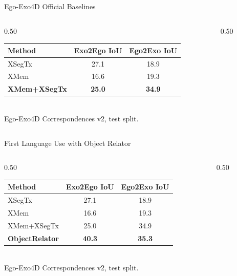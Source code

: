 \documentclass[professionalfonts,aspectratio=169]{beamer}
\begin{document}
\begin{frame}[t]
\begin{center}
{\large Ego-Exo4D Official Baselines}
\end{center}
\vfill
\begin{columns}
  \begin{column}{0.50\textwidth}
    \centering
    \small
    \begin{tabular}{lcc}
      \toprule
      Method & Exo2Ego IoU & Ego2Exo IoU \\
      \midrule
      XSegTx      & 27.1 & 18.9 \\
      XMem        & 16.6 & 19.3 \\
     \textbf{ XMem+XSegTx} & \textbf{25.0} & \textbf{34.9} \\
      \bottomrule
    \end{tabular}
    \\[0.6em]
    {\scriptsize Ego-Exo4D Correspondences v2, test split.}
  \end{column}
  \begin{column}{0.50\textwidth}
    \mbox{}
  \end{column}
\end{columns}
\vfill
\end{frame}

\begin{frame}[t]
\begin{center}
{\large First Language Use with Object Relator}
\end{center}
\vfill
\begin{columns}
  \begin{column}{0.50\textwidth}
    \centering
    \small
    \begin{tabular}{lcc}
      \toprule
      Method & Exo2Ego IoU & Ego2Exo IoU \\
      \midrule
      XSegTx      & 27.1 & 18.9 \\
      XMem        & 16.6 & 19.3 \\
      XMem+XSegTx & 25.0 & 34.9 \\
      \midrule
      \textbf{ObjectRelator} & \textbf{40.3} & \textbf{35.3} \\
      \bottomrule
    \end{tabular}
    \\[0.6em]
    {\scriptsize Ego-Exo4D Correspondences v2, test split.}
  \end{column}
  \begin{column}{0.50\textwidth}
    \mbox{}
  \end{column}
\end{columns}
\vfill
\end{frame}
\end{document}
